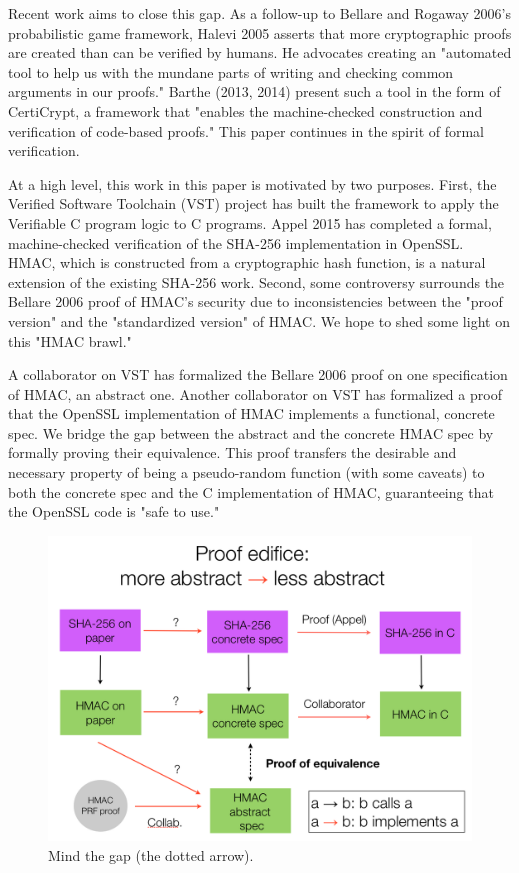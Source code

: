 \documentclass[twocolumn,showpacs,%
  nofootinbib,aps,superscriptaddress,%
  eqsecnum,prd,notitlepage,showkeys,10pt]{revtex4-1}
\begin{document}
Recent work aims to close this gap. As a follow-up to Bellare and Rogaway 2006's probabilistic game framework, Halevi 2005 asserts that more cryptographic proofs are created than can be verified by humans. He advocates creating an "automated tool to help us with the mundane parts of writing and checking common arguments in our proofs." Barthe (2013, 2014) present such a  tool in the form of CertiCrypt, a framework that "enables the machine-checked construction and verification of code-based proofs." This paper continues in the spirit of formal verification. 

At a high level, this work in this paper is motivated by two purposes. First, the Verified Software Toolchain (VST) project has built the framework to apply the Verifiable C program logic to C programs. Appel 2015 has completed a formal, machine-checked verification of the SHA-256 implementation in OpenSSL. HMAC, which is constructed from a cryptographic hash function, is a natural extension of the existing SHA-256 work. Second, some controversy surrounds the Bellare 2006 proof of HMAC's security due to inconsistencies between the "proof version" and the "standardized version" of HMAC. We hope to shed some light on this "HMAC brawl."

A collaborator on VST has formalized the Bellare 2006 proof on one specification of HMAC, an abstract one. Another collaborator on VST has formalized a proof that the OpenSSL implementation of HMAC implements a functional, concrete spec. We bridge the gap between the abstract and the concrete HMAC spec by formally proving their equivalence. This proof transfers the desirable and necessary property of being a pseudo-random function (with some caveats) to both the concrete spec and the C implementation of HMAC, guaranteeing that the OpenSSL code is "safe to use."

\begin{figure}[h!]
	\centering
	\includegraphics[scale=0.35]{Proof_edifice}
	\caption{Mind the gap (the dotted arrow).}
\end{figure}	
\end{document}
